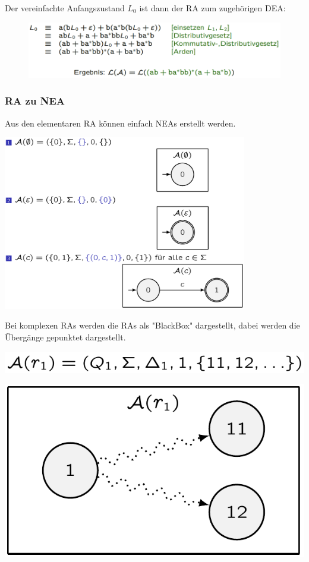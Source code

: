 \documentclass[12pt,a4paper]{article}
\begin{document}
	Der vereinfachte Anfangszustand $L_0$ ist dann der RA zum zugehörigen DEA:\newline
	\begin{center}
		\begin{figure}[!h]
			\includegraphics[width=\textwidth]{Bilder/DEAzuRA3.png}
		\end{figure}
	\end{center}

	\subsubsection{RA zu NEA}
	Aus den elementaren RA können einfach NEAs erstellt werden.
	\begin{center}
			\includegraphics[width=0.8\textwidth]{Bilder/ElementareRAzuDEA.png}
	\end{center}
	Bei komplexen RAs werden die RAs als "BlackBox" dargestellt, dabei werden die Übergänge gepunktet dargestellt.

	\begin{center}
			\includegraphics[width=.7\textwidth]{Bilder/KomplexeRABeispiel.png}
	\end{center}

	\begin{center}
			\includegraphics[width=.7\textwidth]{Bilder/BlackBoxExample.png}
	\end{center}
\end{document}
